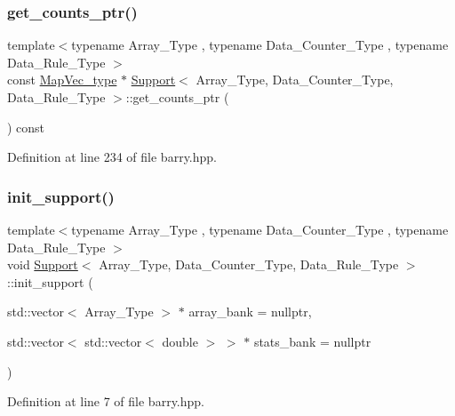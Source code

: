 \subsubsection{\texorpdfstring{get\+\_\+counts\+\_\+ptr()}{get\_counts\_ptr()}}
{\footnotesize\ttfamily template$<$typename Array\+\_\+\+Type , typename Data\+\_\+\+Counter\+\_\+\+Type , typename Data\+\_\+\+Rule\+\_\+\+Type $>$ \\
const \hyperlink{namespacebarry_a2f0d3aab1d67e4c8eaeab9022e16139f}{Map\+Vec\+\_\+type} $\ast$ \hyperlink{classbarry_1_1_support}{Support}$<$ Array\+\_\+\+Type, Data\+\_\+\+Counter\+\_\+\+Type, Data\+\_\+\+Rule\+\_\+\+Type $>$\+::get\+\_\+counts\+\_\+ptr (\begin{DoxyParamCaption}{ }\end{DoxyParamCaption}) const\hspace{0.3cm}{\ttfamily [inline]}}



Definition at line 234 of file barry.\+hpp.

\mbox{\label{classbarry_1_1_support_a013872a55ffd6a0a931e124da8e8dc99}} 
\subsubsection{\texorpdfstring{init\+\_\+support()}{init\_support()}}
{\footnotesize\ttfamily template$<$typename Array\+\_\+\+Type , typename Data\+\_\+\+Counter\+\_\+\+Type , typename Data\+\_\+\+Rule\+\_\+\+Type $>$ \\
void \hyperlink{classbarry_1_1_support}{Support}$<$ Array\+\_\+\+Type, Data\+\_\+\+Counter\+\_\+\+Type, Data\+\_\+\+Rule\+\_\+\+Type $>$\+::init\+\_\+support (\begin{DoxyParamCaption}\item[{std\+::vector$<$ Array\+\_\+\+Type $>$ $\ast$}]{array\+\_\+bank = {\ttfamily nullptr},  }\item[{std\+::vector$<$ std\+::vector$<$ double $>$ $>$ $\ast$}]{stats\+\_\+bank = {\ttfamily nullptr} }\end{DoxyParamCaption})\hspace{0.3cm}{\ttfamily [inline]}}



Definition at line 7 of file barry.\+hpp.

